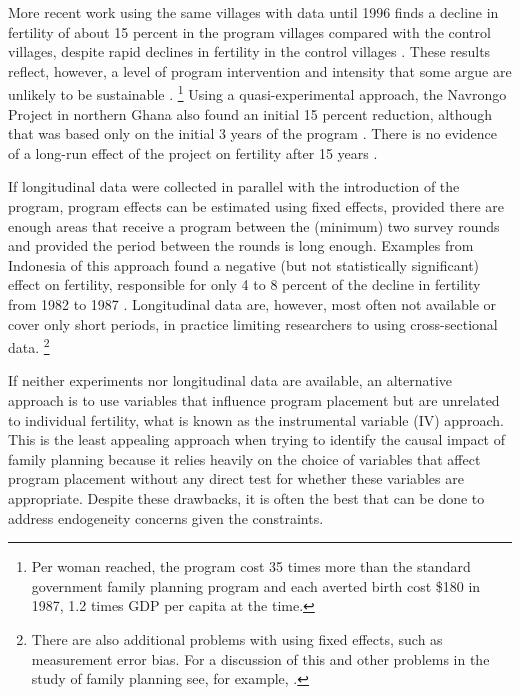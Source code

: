 \documentclass[letterpaper,12pt]{article}
\begin{document}
More recent work using the same villages with data until 1996 finds a
decline in fertility of about 15 percent in the program villages
compared with the control villages, despite rapid declines in fertility
in the control villages \citep{Sinha2005,Joshi2007}. 
These results reflect, however, a level of program intervention and
intensity that some argue are unlikely to be sustainable
\citep{pritchett94a}.%
\footnote{
Per woman reached, the program cost 35 times more than the standard
government family planning program and each averted birth cost \$180 in
1987, 1.2 times GDP per capita at the time.} 
Using a quasi-experimental approach, the Navrongo Project in northern
Ghana also found an initial 15 percent reduction, although that was
based only on the initial 3 years of the program \citep{Debpuur2002}. 
There is no evidence of a long-run effect of the project on fertility
after 15 years \citep{Phillips2012}.

If longitudinal data were collected in parallel with the introduction of
the program, program effects can be estimated using fixed effects,
provided there are enough areas that receive a program between the
(minimum) two survey rounds and provided the period between the rounds
is long enough. 
Examples from Indonesia of this approach found a negative (but not
statistically significant) effect on fertility, responsible for only 4
to 8 percent of the decline in fertility from 1982 to 1987
\citep{pitt93,Gertler1994}. 
Longitudinal data are, however, most often not available or cover only
short periods, in practice limiting researchers to using cross-sectional
data.%
\footnote{
There are also additional problems with using fixed effects, such as
measurement error bias. 
For a discussion of this and other problems in the study of family
planning see, for example, \cite{angeles98}.}

If neither experiments nor longitudinal data are available, an
alternative approach is to use variables that influence program
placement but are unrelated to individual fertility, what is known as
the instrumental variable (IV) approach. 
This is the least appealing approach when trying to identify the causal
impact of family planning because it relies heavily on the choice of
variables that affect program placement without any direct test for
whether these variables are appropriate. 
Despite these drawbacks, it is often the best that can be done to
address endogeneity concerns given the constraints.
\end{document}
